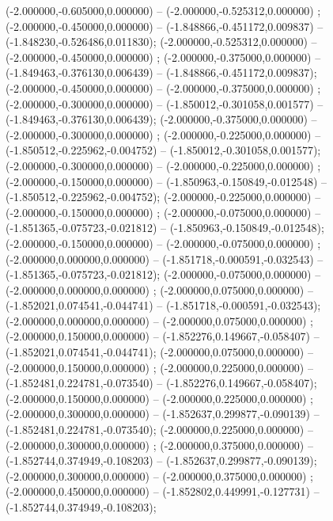  (-2.000000,-0.605000,0.000000) -- (-2.000000,-0.525312,0.000000) ;
 (-2.000000,-0.450000,0.000000) -- (-1.848866,-0.451172,0.009837) -- (-1.848230,-0.526486,0.011830);
 (-2.000000,-0.525312,0.000000) -- (-2.000000,-0.450000,0.000000) ;
 (-2.000000,-0.375000,0.000000) -- (-1.849463,-0.376130,0.006439) -- (-1.848866,-0.451172,0.009837);
 (-2.000000,-0.450000,0.000000) -- (-2.000000,-0.375000,0.000000) ;
 (-2.000000,-0.300000,0.000000) -- (-1.850012,-0.301058,0.001577) -- (-1.849463,-0.376130,0.006439);
 (-2.000000,-0.375000,0.000000) -- (-2.000000,-0.300000,0.000000) ;
 (-2.000000,-0.225000,0.000000) -- (-1.850512,-0.225962,-0.004752) -- (-1.850012,-0.301058,0.001577);
 (-2.000000,-0.300000,0.000000) -- (-2.000000,-0.225000,0.000000) ;
 (-2.000000,-0.150000,0.000000) -- (-1.850963,-0.150849,-0.012548) -- (-1.850512,-0.225962,-0.004752);
 (-2.000000,-0.225000,0.000000) -- (-2.000000,-0.150000,0.000000) ;
 (-2.000000,-0.075000,0.000000) -- (-1.851365,-0.075723,-0.021812) -- (-1.850963,-0.150849,-0.012548);
 (-2.000000,-0.150000,0.000000) -- (-2.000000,-0.075000,0.000000) ;
 (-2.000000,0.000000,0.000000) -- (-1.851718,-0.000591,-0.032543) -- (-1.851365,-0.075723,-0.021812);
 (-2.000000,-0.075000,0.000000) -- (-2.000000,0.000000,0.000000) ;
 (-2.000000,0.075000,0.000000) -- (-1.852021,0.074541,-0.044741) -- (-1.851718,-0.000591,-0.032543);
 (-2.000000,0.000000,0.000000) -- (-2.000000,0.075000,0.000000) ;
 (-2.000000,0.150000,0.000000) -- (-1.852276,0.149667,-0.058407) -- (-1.852021,0.074541,-0.044741);
 (-2.000000,0.075000,0.000000) -- (-2.000000,0.150000,0.000000) ;
 (-2.000000,0.225000,0.000000) -- (-1.852481,0.224781,-0.073540) -- (-1.852276,0.149667,-0.058407);
 (-2.000000,0.150000,0.000000) -- (-2.000000,0.225000,0.000000) ;
 (-2.000000,0.300000,0.000000) -- (-1.852637,0.299877,-0.090139) -- (-1.852481,0.224781,-0.073540);
 (-2.000000,0.225000,0.000000) -- (-2.000000,0.300000,0.000000) ;
 (-2.000000,0.375000,0.000000) -- (-1.852744,0.374949,-0.108203) -- (-1.852637,0.299877,-0.090139);
 (-2.000000,0.300000,0.000000) -- (-2.000000,0.375000,0.000000) ;
 (-2.000000,0.450000,0.000000) -- (-1.852802,0.449991,-0.127731) -- (-1.852744,0.374949,-0.108203);
